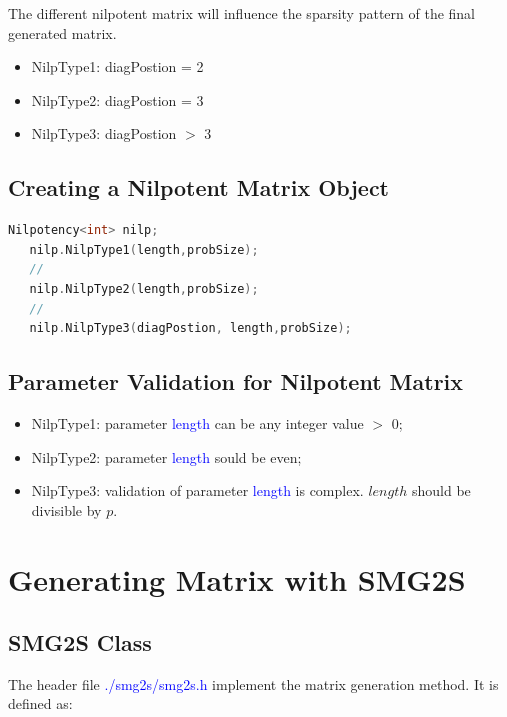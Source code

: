 \documentclass[a4paper, 10 pt]{report}
\begin{document}
The different nilpotent matrix will influence the sparsity pattern of the final generated matrix.

\begin{itemize}
	\item NilpType1: diagPostion = 2
	\item NilpType2: diagPostion = 3
	\item NilpType3: diagPostion $>$ 3
\end{itemize}


	\section{Creating a Nilpotent Matrix Object}
	
	\begin{lstlisting}[language=C++,frame=single]
   Nilpotency<int> nilp;
   nilp.NilpType1(length,probSize);
   //
   nilp.NilpType2(length,probSize);
   //
   nilp.NilpType3(diagPostion, length,probSize);
	\end{lstlisting}
	
	\section{Parameter Validation for Nilpotent Matrix}
	\begin{itemize}
	\item NilpType1: parameter \textcolor{blue}{length} can be any integer value $>$ 0;
	\item NilpType2: parameter \textcolor{blue}{length} sould be even;
	\item NilpType3: validation of parameter \textcolor{blue}{length} is complex. $length$ should be divisible by $p$.
\end{itemize}

	\newpage

	\chapter{Generating Matrix with SMG2S}
	
	\section{SMG2S Class}
	The header file \textcolor{blue}{./smg2s/smg2s.h} implement the matrix generation method. It is defined as:
	
\end{document}
